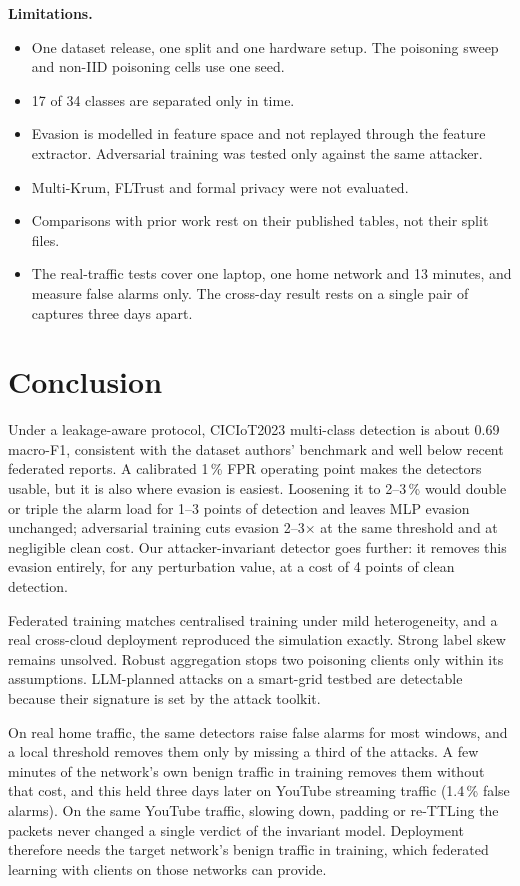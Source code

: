 \documentclass[conference]{IEEEtran}
\begin{document}
\textbf{Limitations.}
\begin{itemize}
\item One dataset release, one split and one hardware setup. The poisoning sweep and non-IID poisoning cells use one seed.
\item 17 of 34 classes are separated only in time.
\item Evasion is modelled in feature space and not replayed through the feature extractor. Adversarial training was tested only against the same attacker.
\item Multi-Krum, FLTrust and formal privacy were not evaluated.
\item Comparisons with prior work rest on their published tables, not their split files.
\item The real-traffic tests cover one laptop, one home network and 13 minutes, and measure false alarms only. The cross-day result rests on a single pair of captures three days apart.
\end{itemize}

\section{Conclusion}
Under a leakage-aware protocol, CICIoT2023 multi-class detection is about 0.69 macro-F1, consistent with the dataset authors' benchmark and well below recent federated reports. A calibrated 1\,\% FPR operating point makes the detectors usable, but it is also where evasion is easiest. Loosening it to 2--3\,\% would double or triple the alarm load for 1--3 points of detection and leaves MLP evasion unchanged; adversarial training cuts evasion 2--3$\times$ at the same threshold and at negligible clean cost. Our attacker-invariant detector goes further: it removes this evasion entirely, for any perturbation value, at a cost of 4 points of clean detection.

Federated training matches centralised training under mild heterogeneity, and a real cross-cloud deployment reproduced the simulation exactly. Strong label skew remains unsolved. Robust aggregation stops two poisoning clients only within its assumptions. LLM-planned attacks on a smart-grid testbed are detectable because their signature is set by the attack toolkit.

On real home traffic, the same detectors raise false alarms for most windows, and a local threshold removes them only by missing a third of the attacks. A few minutes of the network's own benign traffic in training removes them without that cost, and this held three days later on YouTube streaming traffic (1.4\,\% false alarms). On the same YouTube traffic, slowing down, padding or re-TTLing the packets never changed a single verdict of the invariant model. Deployment therefore needs the target network's benign traffic in training, which federated learning with clients on those networks can provide.
\end{document}

